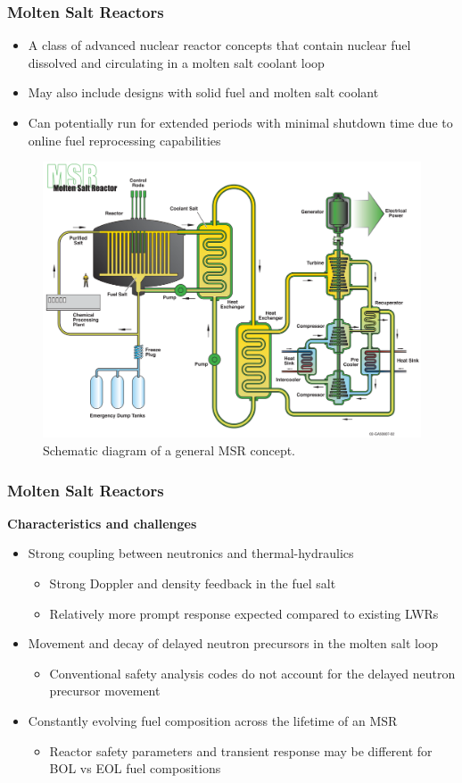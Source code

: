 \begin{frame}
	\frametitle{Molten Salt Reactors}
		\begin{itemize}
			\item A class of advanced nuclear reactor concepts that contain
			nuclear fuel dissolved and circulating in a molten salt coolant
			loop
			\item May also include designs with solid fuel and molten salt
			coolant
			\item Can potentially run for extended periods with minimal shutdown
			time due to online fuel reprocessing capabilities
		\end{itemize}
		\begin{figure}
			\centering
			\includegraphics[width=.5\textwidth]{./images/msr}
			\caption{Schematic diagram of a general \gls{MSR} concept.}
			\label{fig:msr}
		\end{figure}
\end{frame}

\begin{frame}
	\frametitle{Molten Salt Reactors}
		\textbf{Characteristics and challenges}
		\begin{itemize}
			\item Strong coupling between neutronics and thermal-hydraulics
			\begin{itemize}
				\item Strong Doppler and density feedback in the fuel salt
				\item Relatively more prompt response expected compared to
				existing LWRs
			\end{itemize}
			\item Movement and decay of delayed neutron precursors in the molten
			salt loop
			\begin{itemize}
				\item Conventional safety analysis codes do not account for the
				delayed neutron precursor movement
			\end{itemize}
			\item Constantly evolving fuel composition across the lifetime of an
			\gls{MSR}
			\begin{itemize}
				\item Reactor safety parameters and transient response may be
				different for \gls{BOL} vs \gls{EOL} fuel compositions
			\end{itemize}
		\end{itemize}
\end{frame}
